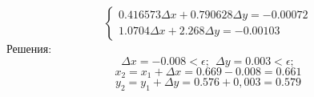 \documentclass{article}
\begin{document}
\[\begin{cases}
    0.416573\Delta x +0.790628\Delta y = -0.00072\\
    1.0704\Delta x + 2.268\Delta y = -0.00103
\end{cases} 
\]
Решения:
\[\Delta x = -0.008 < \epsilon; \ \ 
\Delta y = 0.003 < \epsilon;
\]
\[x_2 = x_1 + \Delta x = 0.669 - 0.008 = 0.661\]
\[y_2 = y_1 + \Delta y = 0.576 + 0,003 = 0.579\]
\end{document}

